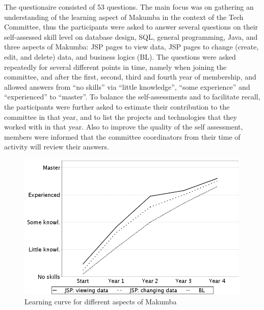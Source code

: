 \documentclass{sig-alt-release2}
\begin{document}
The questionaire consisted of 53 questions. The main focus was on gathering an understanding of the learning aspect of Makumba in the context of the Tech Committee, thus the participants were asked to answer several questions on their self-assessed skill level on database design, SQL, general programming, Java, and three aspects of Makumba: JSP pages to view data, JSP pages to change (create, edit, and delete) data, and business logics (BL). The questions were asked repeatedly for several different points in time, namely when joining the committee, and after the first, second, third and fourth year of membership, and allowed answers from ``no skills'' via ``little knowledge'', ``some experience'' and ``experienced'' to ``master''. To balance the self-assessments and to facilitate recall, the participants were further asked to estimate their contribution to the committee in that year, and to list the projects and technologies that they worked with in that year. Also to improve the quality of the self assessment, members were informed that the committee coordinators from their time of activity will review their answers.

\begin{figure}
  \includegraphics[width=0.98\columnwidth]{figures/learning-technologies}
  \caption{Learning curve for different aspects of Makumba}
  \label{fig:learning-technologies}
\end{figure} 
\end{document}
